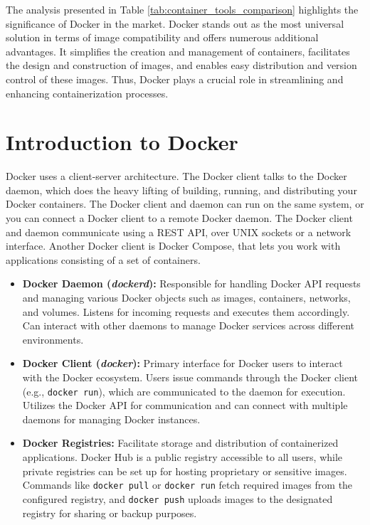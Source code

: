 The analysis presented in Table \ref{tab:container_tools_comparison} highlights the significance of Docker in the market. Docker stands out as the most universal solution in terms of image compatibility and offers numerous additional advantages. It simplifies the creation and management of containers, facilitates the design and construction of images, and enables easy distribution and version control of these images. Thus, Docker plays a crucial role in streamlining and enhancing containerization processes.

\section{Introduction to Docker}
Docker uses a client-server architecture. The Docker client talks to the Docker daemon, which does the heavy lifting of building, running, and distributing your Docker containers. The Docker client and daemon can run on the same system, or you can connect a Docker client to a remote Docker daemon. The Docker client and daemon communicate using a REST API, over UNIX sockets or a network interface. Another Docker client is Docker Compose, that lets you work with applications consisting of a set of containers.
\newpage
\begin{itemize}
  \item \textbf{Docker Daemon (\textit{dockerd}):} Responsible for handling Docker API requests and managing various Docker objects such as images, containers, networks, and volumes. Listens for incoming requests and executes them accordingly. Can interact with other daemons to manage Docker services across different environments.
  
  \item \textbf{Docker Client (\textit{docker}):} Primary interface for Docker users to interact with the Docker ecosystem. Users issue commands through the Docker client (e.g., \texttt{docker run}), which are communicated to the daemon for execution. Utilizes the Docker API for communication and can connect with multiple daemons for managing Docker instances.
  
  \item \textbf{Docker Registries:} Facilitate storage and distribution of containerized applications. Docker Hub is a public registry accessible to all users, while private registries can be set up for hosting proprietary or sensitive images. Commands like \texttt{docker pull} or \texttt{docker run} fetch required images from the configured registry, and \texttt{docker push} uploads images to the designated registry for sharing or backup purposes.
\end{itemize}

